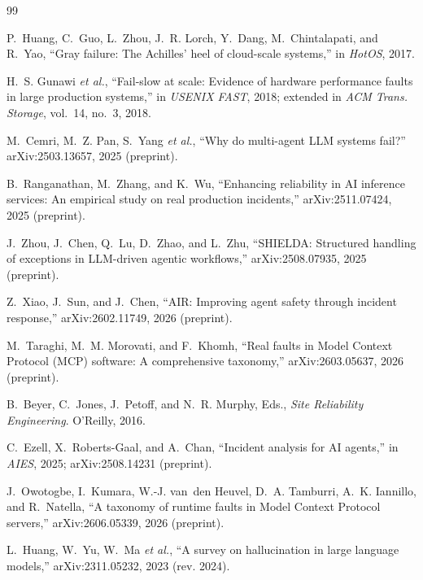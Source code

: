\documentclass[conference]{IEEEtran}
\begin{document}
\begin{thebibliography}{99}
\footnotesize

P.~Huang, C.~Guo, L.~Zhou, J.~R. Lorch, Y.~Dang, M.~Chintalapati, and R.~Yao,
``Gray failure: The Achilles' heel of cloud-scale systems,'' in \emph{HotOS},
2017.

H.~S. Gunawi \emph{et al.}, ``Fail-slow at scale: Evidence of hardware
performance faults in large production systems,'' in \emph{USENIX FAST},
2018; extended in \emph{ACM Trans. Storage}, vol.~14, no.~3, 2018.

M.~Cemri, M.~Z. Pan, S.~Yang \emph{et al.}, ``Why do multi-agent LLM systems
fail?'' arXiv:2503.13657, 2025 (preprint).

B.~Ranganathan, M.~Zhang, and K.~Wu, ``Enhancing reliability in AI inference
services: An empirical study on real production incidents,''
arXiv:2511.07424, 2025 (preprint).

J.~Zhou, J.~Chen, Q.~Lu, D.~Zhao, and L.~Zhu, ``SHIELDA: Structured handling
of exceptions in LLM-driven agentic workflows,'' arXiv:2508.07935, 2025
(preprint).

Z.~Xiao, J.~Sun, and J.~Chen, ``AIR: Improving agent safety through incident
response,'' arXiv:2602.11749, 2026 (preprint).

M.~Taraghi, M.~M. Morovati, and F.~Khomh, ``Real faults in Model Context
Protocol (MCP) software: A comprehensive taxonomy,'' arXiv:2603.05637, 2026
(preprint).

B.~Beyer, C.~Jones, J.~Petoff, and N.~R. Murphy, Eds., \emph{Site Reliability
Engineering}. O'Reilly, 2016.

C.~Ezell, X.~Roberts-Gaal, and A.~Chan, ``Incident analysis for AI agents,''
in \emph{AIES}, 2025; arXiv:2508.14231 (preprint).

J.~Owotogbe, I.~Kumara, W.-J. van~den Heuvel, D.~A. Tamburri, A.~K.
Iannillo, and R.~Natella, ``A taxonomy of runtime faults in Model Context
Protocol servers,'' arXiv:2606.05339, 2026 (preprint).

L.~Huang, W.~Yu, W.~Ma \emph{et al.}, ``A survey on hallucination in large
language models,'' arXiv:2311.05232, 2023 (rev. 2024).


\end{thebibliography}
\end{document}

